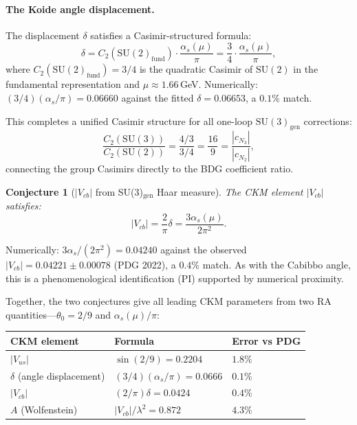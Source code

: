 \documentclass[11pt]{article}
\newtheorem{conjecture}{Conjecture}
\begin{document}
\paragraph{The Koide angle displacement.} The displacement $\delta$ satisfies a Casimir-structured formula:
\begin{equation}
\delta = C_2(\mathrm{SU}(2)_{\mathrm{fund}})\cdot\frac{\alpha_s(\mu)}{\pi} = \frac{3}{4}\cdot\frac{\alpha_s(\mu)}{\pi},
\end{equation}
where $C_2(\mathrm{SU}(2)_{\mathrm{fund}})=3/4$ is the quadratic Casimir of $\mathrm{SU}(2)$ in the fundamental representation and $\mu\approx 1.66$\,GeV. Numerically: $(3/4)(\alpha_s/\pi)=0.06660$ against the fitted $\delta=0.06653$, a $0.1\%$ match.

This completes a unified Casimir structure for all one-loop $\mathrm{SU}(3)_{\mathrm{gen}}$ corrections:
\begin{equation}
\frac{C_2(\mathrm{SU}(3))}{C_2(\mathrm{SU}(2))} = \frac{4/3}{3/4} = \frac{16}{9} = \frac{|c_{N_3}|}{|c_{N_2}|},
\end{equation}
connecting the group Casimirs directly to the BDG coefficient ratio.

\begin{conjecture}[$|V_{cb}|$ from SU(3)$_{\mathrm{gen}}$ Haar measure]
\label{conj:vcb}
The CKM element $|V_{cb}|$ satisfies:
\begin{equation}
|V_{cb}| = \frac{2}{\pi}\delta = \frac{3\alpha_s(\mu)}{2\pi^2}.
\end{equation}
\end{conjecture}

Numerically: $3\alpha_s/(2\pi^2)=0.04240$ against the observed $|V_{cb}|=0.04221\pm 0.00078$ (PDG 2022), a $0.4\%$ match. As with the Cabibbo angle, this is a phenomenological identification (PI) supported by numerical proximity.

Together, the two conjectures give all leading CKM parameters from two RA quantities---$\theta_0=2/9$ and $\alpha_s(\mu)/\pi$:
\begin{center}
\begin{tabular}{lll}
\toprule
CKM element & Formula & Error vs PDG \\
\midrule
$|V_{us}|$ & $\sin(2/9)=0.2204$ & $1.8\%$ \\
$\delta$ (angle displacement) & $(3/4)(\alpha_s/\pi)=0.0666$ & $0.1\%$ \\
$|V_{cb}|$ & $(2/\pi)\delta=0.0424$ & $0.4\%$ \\
$A$ (Wolfenstein) & $|V_{cb}|/\lambda^2=0.872$ & $4.3\%$ \\
\bottomrule
\end{tabular}
\end{center}
\end{document}
